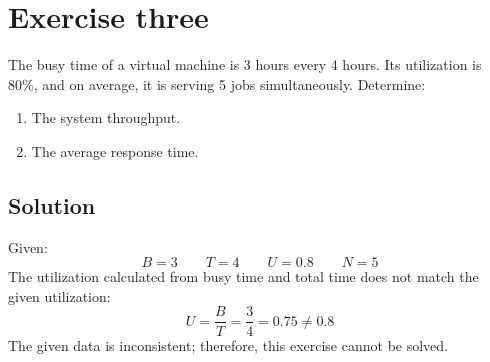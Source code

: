 \section{Exercise three}

The busy time of a virtual machine is 3 hours every 4 hours. 
Its utilization is 80\%, and on average, it is serving 5 jobs simultaneously. 
Determine:
\begin{enumerate}
    \item The system throughput.
    \item The average response time.
\end{enumerate}

\subsection*{Solution}
Given:
\[B=3\qquad T=4\qquad U=0.8 \qquad N=5\]
The utilization calculated from busy time and total time does not match the given utilization:
\[U=\dfrac{B}{T}=\dfrac{3}{4}=0.75\neq 0.8\]
The given data is inconsistent; therefore, this exercise cannot be solved.